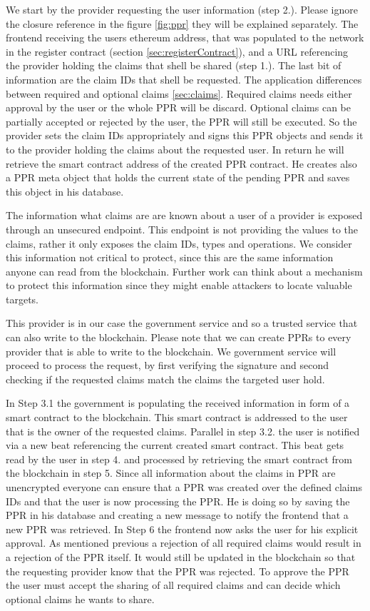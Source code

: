 We start by the provider requesting the user information (step 2.). Please ignore the closure reference in the figure \ref{fig:ppr} they will be explained separately.  The frontend receiving the users ethereum address, that was populated to the network in the register contract (section \ref{sec:registerContract}), and a URL referencing the provider holding the claims that shell be shared (step 1.). The last bit of information are the claim IDs that shell be requested. The application differences between required and optional claims \ref{sec:claims}. Required claims needs either approval by the user or the whole PPR will be discard. Optional claims can be partially accepted or rejected by the user, the PPR will still be executed. So the provider sets the claim IDs appropriately and signs this PPR objects and sends it to the provider holding the claims about the requested user. In return he will retrieve the smart contract address of the created PPR contract. He creates also a PPR meta object that holds the current state of the pending PPR and saves this object in his database. 

The information what claims are are known about a user of a provider is exposed through an unsecured endpoint. This endpoint is not providing the values to the claims, rather it only exposes the claim IDs, types and operations. We consider this information not critical to protect, since this are the same information anyone can read from the blockchain. Further work can think about a mechanism to protect this information since they might enable attackers to locate valuable targets. 

This provider is in our case the government service and so a trusted service that can also write to the blockchain. Please note that we can create PPRs to every provider that is able to write to the blockchain. We government service will proceed to process the request, by first verifying the signature and second checking if the requested claims match the claims the targeted user hold. 

In Step 3.1 the government is populating the received information in form of a smart contract to the blockchain. This smart contract is addressed to the user that is the owner of the requested claims. Parallel in step 3.2. the user is notified via a new beat referencing the current created smart contract.
This beat gets read by the user in step 4. and processed by retrieving the smart contract from the blockchain in step 5. Since all information about the claims in PPR are unencrypted everyone can ensure that a PPR was created over the defined claims IDs and that the user is now processing the PPR. He is doing so by saving the PPR in his database and creating a new message to notify the frontend that a new PPR was retrieved. In Step 6 the frontend now asks the user for his explicit approval. As mentioned previous a rejection of all required claims would result in a rejection of the PPR itself. It would still be updated in the blockchain so that the requesting provider know that the PPR was rejected. To approve the PPR the user must accept the sharing of all required claims and can decide which optional claims he wants to share.  

